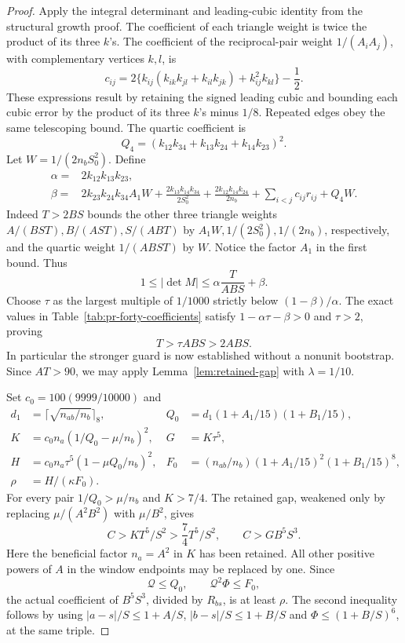 \documentclass[12pt]{article}
\numberwithin{equation}{section}
\begin{document}
\begin{proof}
Apply the integral determinant and leading-cubic identity from the
structural growth proof. The coefficient of each triangle weight is
twice the product of its three \(k\)'s. The coefficient of the
reciprocal-pair weight \(1/(A_iA_j)\), with complementary vertices
\(k,l\), is
\begin{equation}\label{eq:pr-pair-defect}
 c_{ij}=2\{k_{ij}(k_{ik}k_{jl}+k_{il}k_{jk})+k_{ij}^2k_{kl}\}-\frac12.
\end{equation}
These expressions result by retaining the signed leading cubic and
bounding each cubic error by the product of its three \(k\)'s minus
\(1/8\). Repeated edges obey the same telescoping bound. The quartic
coefficient is
\[
 Q_4=(k_{12}k_{34}+k_{13}k_{24}+k_{14}k_{23})^2.
\]
Let \(W=1/(2n_bS_0^2)\). Define
\begin{align*}
 \alpha={}&2k_{12}k_{13}k_{23},\\
 \beta={}&2k_{23}k_{24}k_{34}A_1W
  +\frac{2k_{13}k_{14}k_{34}}{2S_0^2}
  +\frac{2k_{12}k_{14}k_{24}}{2n_b}
  +\sum_{i<j}c_{ij}r_{ij}+Q_4W.
\end{align*}
Indeed \(T>2BS\) bounds the other three triangle weights
\(A/(BST),B/(AST),S/(ABT)\) by
\(A_1W,1/(2S_0^2),1/(2n_b)\), respectively, and the quartic
weight \(1/(ABST)\) by \(W\). Notice the factor \(A_1\) in the
first bound. Thus
\[
 1\le|\det M|\le\alpha\frac{T}{ABS}+\beta.
\]
Choose \(\tau\) as the largest multiple of \(1/1000\) strictly below
\((1-\beta)/\alpha\). The exact values in
Table~\ref{tab:pr-forty-coefficients} satisfy
\(1-\alpha\tau-\beta>0\) and \(\tau>2\), proving
\begin{equation}\label{eq:pr-fixed-fourth-gap}
 T>\tau ABS>2ABS.
\end{equation}
In particular the stronger guard is now established without a
nonunit bootstrap. Since \(AT>90\), we may apply
Lemma~\ref{lem:retained-gap} with \(\lambda=1/10\).

Set \(c_0=100(9999/10000)\) and
\begin{align*}
 d_1&=\lceil\sqrt{n_{ab}/n_b}\rceil_8,&
 Q_0&=d_1(1+A_1/15)(1+B_1/15),\\
 K&=c_0n_a(1/Q_0-\mu/n_b)^2,&G&=K\tau^5,\\
 H&=c_0n_a\tau^5(1-\mu Q_0/n_b)^2,&
 F_0&=(n_{ab}/n_b)(1+A_1/15)^2(1+B_1/15)^8,\\
 \rho&=H/(\kappa F_0).&&
\end{align*}
For every pair \(1/Q_0>\mu/n_b\) and \(K>7/4\).
The retained gap, weakened only by replacing
\(\mu/(A^2B^2)\) with \(\mu/B^2\), gives
\[
 C>K T^5/S^2>\frac74T^5/S^2,
 \qquad C>GB^5S^3.
\]
Here the beneficial factor \(n_a=A^2\) in \(K\) has been retained.
All other positive powers of \(A\) in the window endpoints may be
replaced by one. Since
\[
 \mathcal Q\le Q_0,\qquad \mathcal Q^2\Phi\le F_0,
\]
the actual coefficient of \(B^5S^3\), divided by \(R_{bs}\), is at
least \(\rho\). The second inequality follows by using
\(|a-s|/S\le1+A/S\), \(|b-s|/S\le1+B/S\) and
\(\Phi\le(1+B/S)^6\), at the same triple.


\end{proof}
\end{document}
